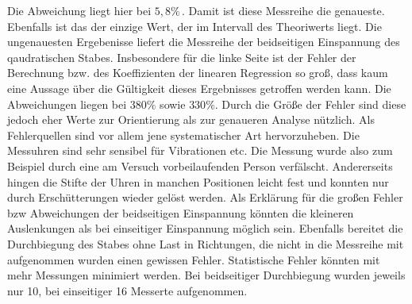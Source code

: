 Die Abweichung liegt hier bei $5,8\%$\,. Damit ist diese Messreihe die genaueste. Ebenfalls ist das der einzige Wert, der im Intervall
des Theoriwerts liegt. Die ungenauesten Ergebenisse liefert die Messreihe der beidseitigen Einspannung des qaudratischen Stabes.
Insbesondere für die linke Seite ist der Fehler der Berechnung bzw. des Koeffizienten der linearen Regression so groß, dass kaum eine Aussage über
die Gültigkeit dieses Ergebnisses getroffen werden kann. Die Abweichungen liegen bei $380\%$ sowie $330\%$. Durch die Größe der Fehler
sind diese jedoch eher Werte zur Orientierung als zur genaueren Analyse nützlich.  
Als Fehlerquellen sind vor allem jene systematischer Art hervorzuheben. Die Messuhren sind sehr sensibel für Vibrationen etc. Die Messung 
wurde also zum Beispiel durch eine am Versuch vorbeilaufenden Person verfälscht. Andererseits hingen die Stifte der Uhren in manchen Positionen leicht 
fest und konnten nur durch Erschütterungen wieder gelöst werden. Als Erklärung für die großen Fehler bzw Abweichungen der beidseitigen Einspannung 
könnten die kleineren Auslenkungen als bei einseitiger Einspannung möglich sein. Ebenfalls bereitet die Durchbiegung des Stabes ohne Last in Richtungen, 
die nicht in die Messreihe mit aufgenommen wurden einen gewissen Fehler. Statistische Fehler könnten mit mehr Messungen minimiert werden. 
Bei beidseitiger Durchbiegung wurden jeweils nur 10, bei einseitiger 16 Messerte aufgenommen.
